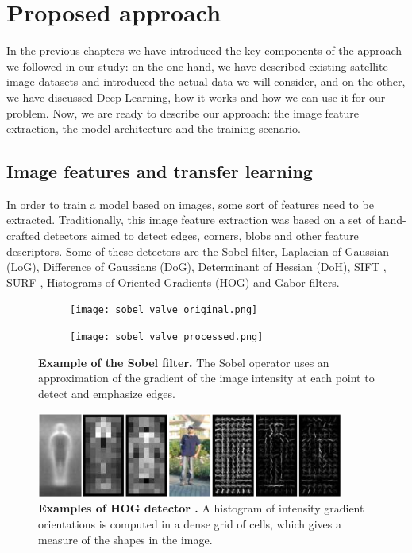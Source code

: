 
\chapter{Proposed approach}

\label{Chapter4}


In the previous chapters we have introduced the key components of the approach we followed in our study: on the one hand, we have described existing satellite image datasets and introduced the actual data we will consider, and on the other, we have discussed Deep Learning, how it works and how we can use it for our problem. Now, we are ready to describe our approach: the image feature extraction, the model architecture and the training scenario.

\section{Image features and transfer learning}\label{sec:transferLearning}

In order to train a model based on images, some sort of features need to be extracted. Traditionally, this image feature extraction was based on a set of hand-crafted detectors aimed to detect edges, corners, blobs and other feature descriptors. Some of these detectors are the Sobel filter, Laplacian of Gaussian (LoG), Difference of Gaussians (DoG), Determinant of Hessian (DoH), SIFT \parencite{Lowe1999,Lowe2004}, SURF \parencite{Bay2006}, Histograms of Oriented Gradients (HOG) \parencite{Dalal2005} and Gabor filters.

\begin{figure}[h!]
	\centering
	\begin{subfigure}{.5\textwidth}
  		\centering
  		\texttt{[image: sobel\_valve\_original.png]}
	\end{subfigure}%
	\begin{subfigure}{.5\textwidth}
  		\centering
  		\texttt{[image: sobel\_valve\_processed.png]}
	\end{subfigure}
	\captionsetup{width=1\linewidth}
	\caption{\textbf{Example of the Sobel filter.} The Sobel operator uses an approximation of the gradient of the image intensity at each point to detect and emphasize edges.}
	\label{fig:sobel}
\end{figure}

\begin{figure}[h!]
	\centering
	\includegraphics[width=0.9\textwidth]{Figures/hog_example.png}
	\captionsetup{width=1\linewidth}
	\caption{\textbf{Examples of HOG detector \parencite{Dalal2005}.} A histogram of intensity gradient orientations is computed in a dense grid of cells, which gives a measure of the shapes in the image.}
	\label{fig:hog}
\end{figure}

